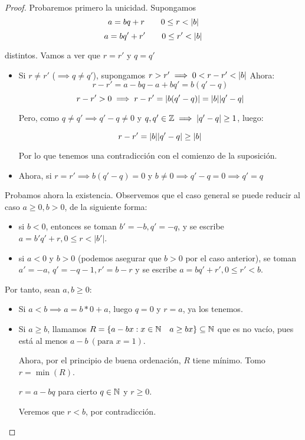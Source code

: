\begin{proof}
Probaremos primero la unicidad. Supongamos
$$a=bq+r \quad \quad 0\leq r <\lvert b\rvert$$
$$a=bq'+r' \quad \quad 0 \leq r' < \lvert b\rvert$$

distintos. Vamos a ver que $r=r'$ y $q=q'$

\begin{itemize}
	\item Si $r \neq r'$ ($\implies q\ne q'$), supongamos $r > r' \implies 0 < r - r' < \lvert b\rvert$
Ahora:
$$ r-r' = a-bq - a +bq' = b(q' -q )$$
$$r-r' > 0 \implies r - r' = \lvert b(q' -q)\rvert = \lvert b\rvert\lvert q' -q\rvert$$

Pero, como $q\neq q' \implies q'-q \neq 0$ y $q,q' \in \mathbb{Z} \implies \lvert q' -q\rvert \geq 1 $, luego:

$$ r-r' = \lvert b\rvert\lvert q' -q\rvert \geq \lvert b\rvert$$

Por lo que tenemos una contradicción con el comienzo de la suposición.

	\item Ahora, si $r=r'\implies b(q' -q) = 0$ y $b\neq 0 \implies q' -q=0 \implies q' =q$
\end{itemize}

Probamos ahora la existencia. Observemos que el caso general se puede reducir al caso $a \ge 0, b > 0$, de la
siguiente forma:

\begin{itemize}
\item si $b<0$, entonces se toman $b' = -b, q' = -q$, y se escribe $a = b'q' +r, 0 \le r < |b'|$.
\item si $a<0$ y $b>0$ (podemos asegurar que $b>0$ por el caso anterior), se toman $a' = -a$, $q' = -q -1, r' = b-r$
  y se escribe $a = bq'+r', 0 \le r' < b$.
\end{itemize}

Por tanto, sean $a,b \geq 0$:

\begin{itemize}
	\item Si $ a < b \implies a = b*0 + a$, luego $q=0$ y $r=a$, ya los tenemos.
	\item Si $a \geq b$, llamamos $R=\{a-bx: x\in \mathbb{N} \quad a \geq bx\}\subseteq \mathbb{N}$ que es no vacío, pues está al menos $ a-b \ (\text{para } x=1)$.

	Ahora, por el principio de buena ordenación, $R$ tiene mínimo. Tomo $r=\min(R)$.

$r=a-bq$ para cierto $q \in \mathbb{N}$ y $ r \geq 0$.

Veremos que $r < b$, por contradicción.


\end{itemize}
\end{proof}

